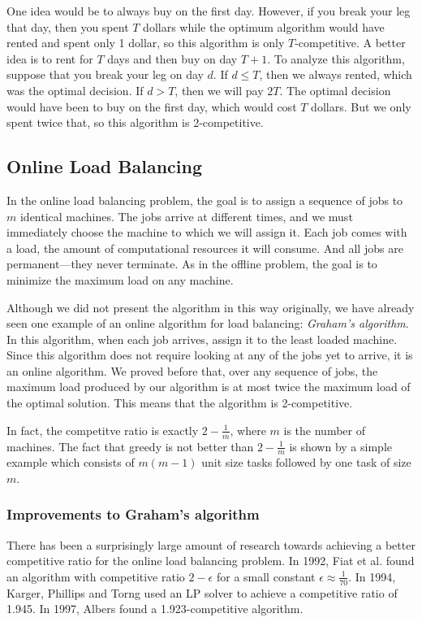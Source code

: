 \documentclass{article}
\begin{document}
One idea would be to always buy on the first day. However, if you
break your leg that day, then you spent $T$ dollars while the
optimum algorithm would have rented and spent only 1 dollar, so
this algorithm is only $T$-competitive. A better idea is to rent
for $T$ days and then buy on day $T+1$. To analyze this algorithm,
suppose that you break your leg on day $d$. If $d\leq T$, then we
always rented, which was the optimal decision. If $d>T$, then we
will pay $2T$. The optimal decision would have been to buy on the
first day, which would cost $T$ dollars. But we only spent twice
that, so this algorithm is 2-competitive.

\subsection{Online Load Balancing}

In the online load balancing problem, the goal is to assign a
sequence of jobs to $m$ identical machines. The jobs arrive at
different times, and we must immediately choose the machine to
which we will assign it. Each job comes with a load, the amount of
computational resources it will consume. And all jobs are
permanent---they never terminate. As in the offline problem, the
goal is to minimize the maximum load on any machine.

Although we did not present the algorithm in this way originally,
we have already seen one example of an online algorithm for load
balancing: \emph{Graham's algorithm}. In this algorithm, when each
job arrives, assign it to the least loaded machine. Since this
algorithm does not require looking at any of the jobs yet to
arrive, it is an online algorithm. We proved before that, over any
sequence of jobs, the maximum load produced by our algorithm is at
most twice the maximum load of the optimal solution. This means
that the algorithm is 2-competitive.

In fact, the competitve ratio is exactly $2-\frac{1}{m}$, where
$m$ is the number of machines. The fact that greedy is not better
than $2-\frac{1}{m}$ is shown by a simple example which consists of
$m(m-1)$ unit size tasks followed by one task of size $m$.

\subsubsection{Improvements to Graham's algorithm}

There has been a surprisingly large amount of research towards
achieving a better competitive ratio for the online load balancing
problem. In 1992, Fiat et al. found an algorithm with competitive
ratio $2-\epsilon$ for a small constant
$\epsilon\approx\frac{1}{70}$. In 1994, Karger, Phillips and Torng
used an LP solver to achieve a competitive ratio of 1.945. In
1997, Albers found a 1.923-competitive algorithm.
\end{document}
